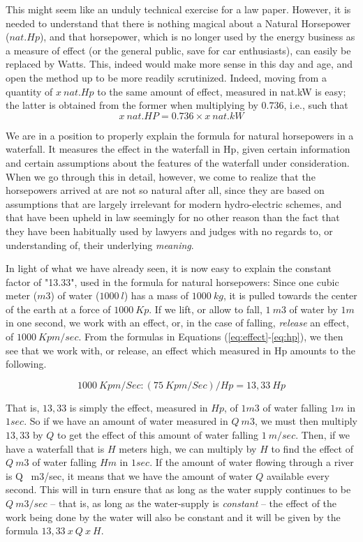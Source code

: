 This might seem like an unduly technical exercise for a law paper. However, it is needed to understand that there is nothing magical about a Natural Horsepower ($nat.Hp$), and that horsepower, which is no longer used by the energy business as a measure of effect (or the general public, save for car enthusiasts), can easily be replaced by Watts. This, indeed would make more sense in this day and age, and open the method up to be more readily scrutinized. Indeed, moving from a quantity of $x \ nat.Hp$ to the same amount of effect, measured in nat.kW is easy; the latter is obtained from the former when multiplying by $0.736$, i.e., such that 
\begin{equation}\label{eq:natkw}
x \ nat.HP = 0.736 \times x \ nat.kW
\end{equation}

We are in a position to properly explain the formula for natural horsepowers in a waterfall. It measures the effect in the waterfall in Hp, given certain information and certain assumptions about the features of the waterfall under consideration. When we go through this in detail, however, we come to realize that the horsepowers arrived at are not so natural after all, since they are based on assumptions that are largely irrelevant for modern hydro-electric schemes, and that have been upheld in law seemingly for no other reason than the fact that they have been habitually used by lawyers and judges with no regards to, or understanding of, their underlying \emph{meaning}.

In light of what we have already seen, it is now easy to explain the constant factor of "13.33", used in the formula for natural horsepowers: Since one cubic meter ($m3$) of water ($1000 \ l$) has a mass of $1000 \ kg$, it is pulled towards the center of the earth at a force of $1000 \ Kp$. If we lift, or allow to fall, $1 \ m3$ of water by $1 m$ in one second, we work with an effect, or, in the case of falling, \emph{release} an effect, of $1000 \ Kpm /sec$. From the formulas in Equations (\ref{eq:effect}-\ref{eq:hp}), we then see that we work with, or release, an effect which measured in Hp amounts to the following.

\begin{equation}\label{eq:whp}
1000 \ Kpm /Sec : (75 \ Kpm /Sec) /Hp = 13,33 \ Hp
\end{equation}

That is, $13,33$ is simply the effect, measured in $Hp$, of $1 m3$ of water falling $1 m$ in $1 sec$. So if we have an amount of water measured in $Q \ m3$, we must then multiply $13,33$ by $Q$ to get the effect of this amount of water falling $1 \ m/sec$. Then, if we have a waterfall that is $H$ meters high, we can multiply by $H$ to find the effect of $Q \ m3$ of water falling $H m$ in $1 sec$. If the amount of water flowing through a river is Q \ m3/sec, it means that we have the amount of water $Q$ available every second. This will in turn ensure that as long as the water supply continues to be $Q \ m3/sec$ -- that is, as long as the water-supply is \emph{constant} -- the effect of the work being done by the water will also be constant and it will be given by the formula $13,33 \ x \ Q \ x \ H$.

